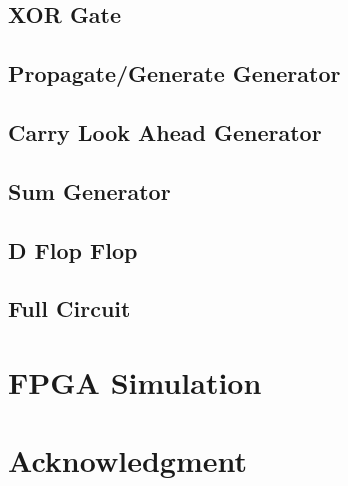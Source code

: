 \documentclass[conference]{IEEEtran}
\begin{document}
\subsection{XOR Gate}

\subsection{Propagate/Generate Generator}

\subsection{Carry Look Ahead Generator}

\subsection{Sum Generator}

\subsection{D Flop Flop}

\subsection{Full Circuit}

\section{FPGA Simulation}

\section*{Acknowledgment}


\begin{thebibliography}{00}
\end{thebibliography}
\end{document}
